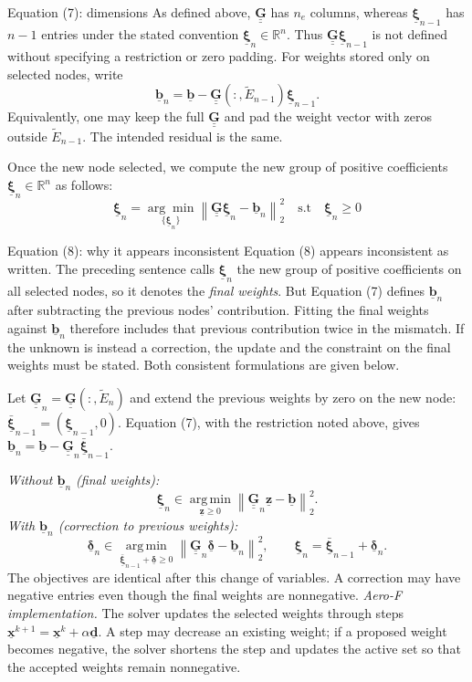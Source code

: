\documentclass[a4paper,12pt]{article}
\newcommand{\vect}[1]{\underline{\boldsymbol{#1}}}
\newcommand{\matr}[1]{\underline{\underline{\boldsymbol{#1}}}}
\newcommand{\lecturanota}[2]{\begin{lecturalarga}{#1}#2\end{lecturalarga}}
\begin{document}
\lecturanota{Equation (7): dimensions}{
As defined above, $\matr{G}$ has $n_e$ columns, whereas $\vect{\xi}_{n-1}$ has $n-1$ entries under the stated convention $\vect{\xi}_n\in\mathbb{R}^n$. Thus $\matr{G}\vect{\xi}_{n-1}$ is not defined without specifying a restriction or zero padding. For weights stored only on selected nodes, write
\[
  \vect{b}_n=\vect{b}-\matr{G}(:,\widetilde{E}_{n-1})\vect{\xi}_{n-1}.
\]
Equivalently, one may keep the full $\matr{G}$ and pad the weight vector with zeros outside $\widetilde{E}_{n-1}$. The intended residual is the same.
}
Once the new node selected, we compute the new group of positive coefficients $\vect{\xi}_n\in\mathbb{R}^{n}$ as follows:
\begin{equation}
\vect{\xi}_n=\underset{\{\vect{\xi}_n\}}{\arg\min}
\left\|\matr{G}\vect{\xi}_n-\vect{b}_n\right\|_2^2
\quad\text{s.t}\quad\vect{\xi}_n\geq 0
\label{eq:classic-nnls}
\end{equation}

\lecturanota{Equation (8): why it appears inconsistent}{
Equation (8) appears inconsistent as written. The preceding sentence calls $\vect{\xi}_n$ the new group of positive coefficients on all selected nodes, so it denotes the \emph{final weights}. But Equation (7) defines $\vect{b}_n$ after subtracting the previous nodes' contribution. Fitting the final weights against $\vect{b}_n$ therefore includes that previous contribution twice in the mismatch. If the unknown is instead a correction, the update and the constraint on the final weights must be stated. Both consistent formulations are given below.

Let $\matr{G}_n=\matr{G}(:,\widetilde{E}_n)$ and extend the previous weights by zero on the new node: $\bar{\vect{\xi}}_{n-1}=(\vect{\xi}_{n-1},0)$. Equation (7), with the restriction noted above, gives $\vect{b}_n=\vect{b}-\matr{G}_n\bar{\vect{\xi}}_{n-1}$.

\emph{Without $\vect{b}_n$ (final weights):}
\[
  \vect{\xi}_n\in\operatorname*{arg\,min}_{\vect{z}\geq0}
  \left\|\matr{G}_n\vect{z}-\vect{b}\right\|_2^2.
\]
\emph{With $\vect{b}_n$ (correction to previous weights):}
\[
  \vect{\delta}_n\in\operatorname*{arg\,min}_{\bar{\vect{\xi}}_{n-1}+\vect{\delta}\geq0}
  \left\|\matr{G}_n\vect{\delta}-\vect{b}_n\right\|_2^2,
  \qquad \vect{\xi}_n=\bar{\vect{\xi}}_{n-1}+\vect{\delta}_n.
\]
The objectives are identical after this change of variables. A correction may have negative entries even though the final weights are nonnegative. \emph{Aero-F implementation.} The solver updates the selected weights through steps $\vect{x}^{k+1}=\vect{x}^{k}+\alpha\vect{d}$. A step may decrease an existing weight; if a proposed weight becomes negative, the solver shortens the step and updates the active set so that the accepted weights remain nonnegative.
}
\end{document}
